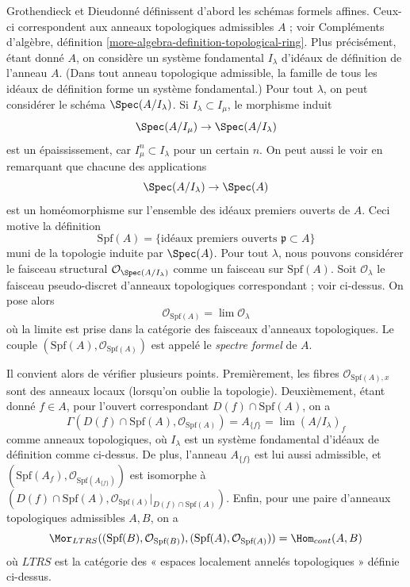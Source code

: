 \medskip\noindent
Grothendieck et Dieudonné définissent d'abord les schémas formels affines.
Ceux-ci correspondent aux anneaux topologiques admissibles $A$ ; voir
Compléments d'algèbre, définition \ref{more-algebra-definition-topological-ring}.
Plus précisément, étant donné $A$, on considère un système fondamental $I_\lambda$ d'idéaux
de définition de l'anneau $A$. (Dans tout anneau topologique admissible,
la famille de tous les idéaux de définition forme un système fondamental.)
Pour tout $\lambda$, on peut considérer le
schéma $\Spec(A/I_\lambda)$. Si $I_\lambda \subset I_\mu$, le
morphisme induit
$$
\Spec(A/I_\mu) \to \Spec(A/I_\lambda)
$$
est un épaississement, car $I_\mu^n \subset I_\lambda$ pour un certain $n$.
On peut aussi le voir en remarquant que chacune des
applications
$$
\Spec(A/I_\lambda) \to \Spec(A)
$$
est un homéomorphisme sur l'ensemble des idéaux premiers ouverts de $A$.
Ceci motive la définition
$$
\text{Spf}(A) = \{\text{idéaux premiers ouverts }\mathfrak p \subset A\}
$$
muni de la topologie induite par $\Spec(A)$. Pour tout $\lambda$,
nous pouvons considérer le faisceau structural $\mathcal{O}_{\Spec(A/I_\lambda)}$
comme un faisceau sur $\text{Spf}(A)$. Soit $\mathcal{O}_\lambda$ le
faisceau pseudo-discret d'anneaux topologiques correspondant ; voir ci-dessus.
On pose alors
$$
\mathcal{O}_{\text{Spf}(A)} = \lim \mathcal{O}_\lambda
$$
où la limite est prise dans la catégorie des faisceaux d'anneaux topologiques.
Le couple $(\text{Spf}(A), \mathcal{O}_{\text{Spf}(A)})$ est appelé le
{\it spectre formel} de $A$.

\medskip\noindent
Il convient alors de vérifier plusieurs points. Premièrement,
les fibres $\mathcal{O}_{\text{Spf}(A), x}$ sont des anneaux locaux
(lorsqu'on oublie la topologie). Deuxièmement, étant donné
$f \in A$, pour l'ouvert correspondant $D(f) \cap \text{Spf}(A)$,
on a
$$
\Gamma(D(f) \cap \text{Spf}(A), \mathcal{O}_{\text{Spf}(A)})
= A_{\{f\}} = \lim (A/I_\lambda)_f
$$
comme anneaux topologiques, où $I_\lambda$ est un système fondamental d'idéaux
de définition comme ci-dessus. De plus, l'anneau $A_{\{f\}}$ est lui aussi admissible, et
$(\text{Spf}(A_f), \mathcal{O}_{\text{Spf}(A_{\{f\}})})$
est isomorphe à
$(D(f) \cap \text{Spf}(A),
\mathcal{O}_{\text{Spf}(A)}|_{D(f) \cap \text{Spf}(A)})$.
Enfin, pour une paire d'anneaux topologiques admissibles $A, B$,
on a
\begin{equation}
\label{equation-morphisms-affine-formal-schemes}
\Mor_{LTRS}((\text{Spf}(B), \mathcal{O}_{\text{Spf}(B)}),
(\text{Spf}(A), \mathcal{O}_{\text{Spf}(A)}))
= \Hom_{cont}(A, B)
\end{equation}
où $LTRS$ est la catégorie des « espaces localement annelés topologiques »
définie ci-dessus.

